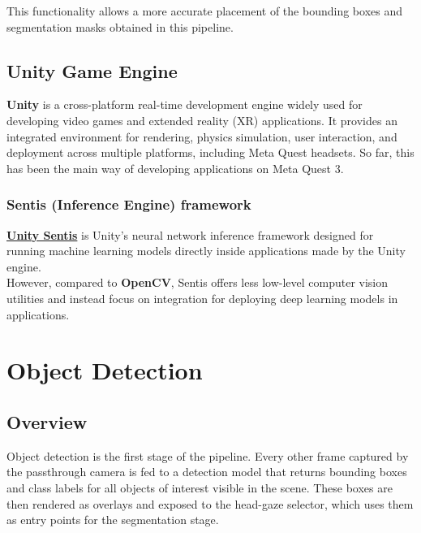 \documentclass{article}
\begin{document}
This functionality allows a more accurate placement of the bounding boxes and segmentation masks obtained in this pipeline.

\subsection{Unity Game Engine}
\textbf{Unity} is a cross-platform real-time development engine widely used for developing video games and extended reality (XR) applications. It provides an integrated environment for rendering, physics simulation, user interaction, and deployment across multiple platforms, including Meta Quest headsets. So far, this has been the main way of developing applications on Meta Quest 3.


\subsubsection{Sentis (Inference Engine) framework}

\href{https://docs.unity3d.com/Packages/com.unity.ai.inference@2.2/manual/index.html}{\textbf{Unity Sentis}} is Unity's neural network inference framework designed for running machine learning models directly inside applications made by the Unity engine. \\

However, compared to \textbf{OpenCV}, Sentis offers less low-level computer vision utilities and instead focus on integration for deploying deep learning models in applications.


\section{Object Detection}
\label{sec:detection}

\subsection{Overview}
Object detection is the first stage of the pipeline. Every other frame captured by the
passthrough camera is fed to a detection model that returns bounding boxes
and class labels for all objects of interest visible in the scene. These boxes are then
rendered as overlays and exposed to the head-gaze selector, which uses
them as entry points for the segmentation stage.
\end{document}
